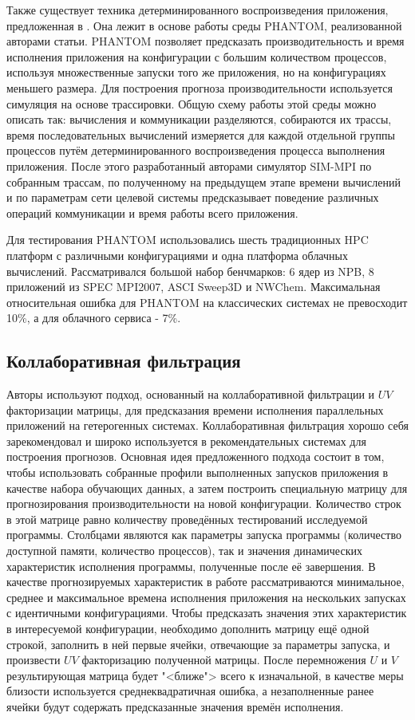		Также существует техника детерминированного воспроизведения приложения, предложенная в \cite{representative_replay}. Она лежит в основе работы среды PHANTOM, реализованной авторами статьи. PHANTOM позволяет предсказать производительность и время исполнения приложения на конфигурации с большим количеством процессов, используя множественные запуски того же приложения, но на конфигурациях меньшего размера. Для построения прогноза производительности используется симуляция на основе трассировки. Общую схему работы этой среды можно описать так: вычисления и коммуникации разделяются, собираются их трассы, время последовательных вычислений измеряется для каждой отдельной группы процессов путём детерминированного воспроизведения процесса выполнения приложения. После этого разработанный авторами симулятор SIM-MPI по собранным трассам, по полученному на предыдущем этапе времени вычислений и по параметрам сети целевой системы предсказывает поведение различных операций коммуникации и время работы всего приложения.

		Для тестирования PHANTOM использовались шесть традиционных HPC платформ с различными конфигурациями и одна платформа облачных вычислений. Рассматривался большой набор бенчмарков: 6 ядер из NPB, 8 приложений из SPEC MPI2007, ASCI Sweep3D и NWChem. Максимальная относительная ошибка для PHANTOM на классических системах не превосходит 10\%, а для облачного сервиса - 7\%.

	\subsection{Коллаборативная фильтрация}
		Авторы \cite{UV_matrix} используют подход, основанный на коллаборативной фильтрации и \(UV\) факторизации матрицы, для предсказания времени исполнения параллельных приложений на гетерогенных системах. Коллаборативная фильтрация хорошо себя зарекомендовал и широко используется в рекомендательных системах для построения прогнозов. Основная идея предложенного подхода состоит в том, чтобы использовать собранные профили выполненных запусков приложения в качестве набора обучающих данных, а затем построить специальную матрицу для прогнозирования производительности на новой конфигурации. Количество строк в этой матрице равно количеству проведённых тестирований исследуемой программы. Столбцами являются как параметры запуска программы (количество доступной памяти, количество процессов), так и значения динамических характеристик исполнения программы, полученные после её завершения. В качестве прогнозируемых характеристик в работе рассматриваются минимальное, среднее и максимальное времена исполнения приложения на нескольких запусках с идентичными конфигурациями. Чтобы предсказать значения этих характеристик в интересуемой конфигурации, необходимо дополнить матрицу ещё одной строкой, заполнить в ней первые ячейки, отвечающие за параметры запуска, и произвести \(UV\) факторизацию полученной матрицы. После перемножения \(U\) и \(V\) результирующая матрица будет "<ближе"> всего к изначальной, в качестве меры близости используется среднеквадратичная ошибка, а незаполненные ранее ячейки будут содержать предсказанные значения времён исполнения.

